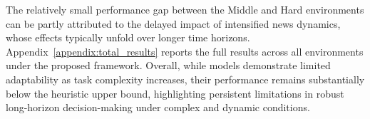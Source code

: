The relatively small performance gap between the Middle and Hard environments can be partly attributed to the delayed impact of intensified news dynamics, whose effects typically unfold over longer time horizons. Appendix~\ref{appendix:total_results} reports the full results across all environments under the proposed framework. Overall, while models demonstrate limited adaptability as task complexity increases, their performance remains substantially below the heuristic upper bound, highlighting persistent limitations in robust long-horizon decision-making under complex and dynamic conditions.